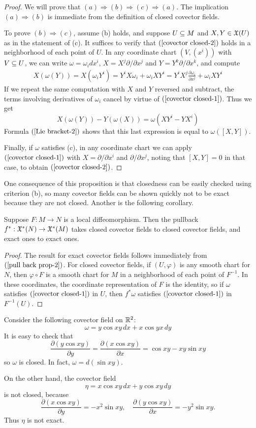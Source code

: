 \begin{proof}
We will prove that $(a)\Rightarrow(b)\Rightarrow(c)\Rightarrow(a)$. The implication $(a)\Rightarrow(b)$ is immediate from the definition of closed covector fields.\par
To prove $(b)\Rightarrow(c)$, assume (b) holds, and suppose $U\subseteq M$ and $X,Y\in\mathfrak{X}(U)$ as in the statement of (c). It suffices to verify that $(\ref{covector closed-2})$ holds in a neighborhood of each point of $U$. In any coordinate chart $(V,(x^i))$ with $V\subseteq U$, we can write $\omega=\omega_idx^i$, $X=X^j\partial/\partial x^j$ and $Y=Y^k\partial/\partial x^k$, and compute
\begin{align*}
X(\omega(Y))=X(\omega_iY^i)=Y^iX\omega_i+\omega_iXY^i=Y^iX^j\frac{\partial\omega_i}{\partial x^j}+\omega_iXY^i
\end{align*}
If we repeat the same computation with $X$ and $Y$ reversed and subtract, the terms involving derivatives of $\omega_i$ cancel by virtue of $(\ref{covector closed-1})$. Thus we get
\[X(\omega(Y))-Y(\omega(X))=\omega(XY^i-YX^i)\]
Formula $(\ref{Lie bracket-2})$ shows that this last expression is equal to $\omega([X,Y])$.\par
Finally, if $\omega$ satisfies (c), in any coordinate chart we can apply $(\ref{covector closed-1})$ with $X=\partial/\partial x^i$ and $\partial/\partial x^j$, noting that $[X,Y]=0$ in that case, to obtain $(\ref{covector closed-2})$.
\end{proof}
One consequence of this proposition is that closedness can be easily checked
using criterion (b), so many covector fields can be shown quickly not to be exact because they are not closed. Another is the following corollary.
\begin{corollary}
Suppose $F:M\to N$ is a local diffeomorphism. Then the pullback $f^*:\mathfrak{X}^*(N)\to\mathfrak{X}^*(M)$ takes closed covector fields to closed covector fields,
and exact ones to exact ones.
\end{corollary}
\begin{proof}
The result for exact covector fields follows immediately from $(\ref{pull back prop-2})$. For closed covector fields, if $(U,\varphi)$ is any smooth chart for $N$, then $\varphi\circ F$ is a smooth chart for $M$ in a neighborhood of each point of $F^{-1}$. In these coordinates, the coordinate representation of $F$ is the identity, so if $\omega$ satisfies $(\ref{covector closed-1})$ in $U$, then $f^*\omega$ satisfies $(\ref{covector closed-1})$ in $F^{-1}(U)$.
\end{proof}
\begin{example}
Consider the following covector field on $\mathbb{R}^2$:
\[\omega=y\cos xy\,dx+x\cos yx\,dy\]
It is easy to check that
\[\frac{\partial(y\cos xy)}{\partial y}=\frac{\partial(x\cos xy)}{\partial x}=\cos xy-xy\sin xy\]
so $\omega$ is closed. In fact, $\omega=d(\sin xy)$.\par
On the other hand, the covector field
\[\eta=x\cos xy\,dx+y\cos xy\,dy\]
is not closed, because
\[\frac{\partial(x\cos xy)}{\partial y}=-x^2\sin xy,\quad \frac{\partial(y\cos xy)}{\partial x}=-y^2\sin xy.\]
Thus $\eta$ is not exact.
\end{example}
